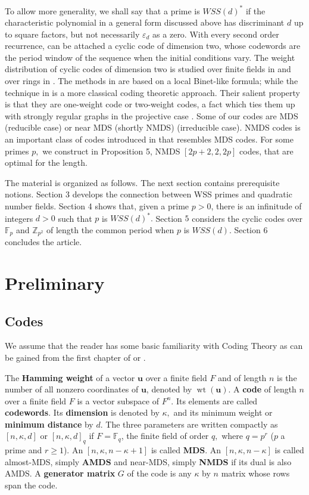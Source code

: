 \documentclass[12pt,reqno]{amsart}
\newcommand{\F}{\mathbb{F}}
\newcommand{\Z}{\mathbb{Z}}
\DeclareMathOperator{\wt}{wt}
\renewcommand{\vec}[1]{\boldsymbol{#1}} %
\begin{document}
To allow more generality, we shall say that a prime is $WSS(d)^*$ if the characteristic polynomial in a general form discussed above has discriminant $d$ up to square factors, but not necessarily $\varepsilon_d$ as a zero.
With every second order recurrence, can be attached a cyclic code of dimension two, whose codewords are the period window of the sequence when the initial conditions vary.
The weight distribution of cyclic codes of dimension two is studied over finite fields in \cite{SZS,V1,V2} and over rings in \cite{SHS,SLS}. The methods in \cite{SHS,SLS,SZS}
are based on a local Binet-like formula; while the technique in \cite{V1,V2} is a more classical coding theoretic approach.
Their salient property is that they are one-weight code or
two-weight codes, a fact which ties them up with strongly regular graphs in the projective case \cite{BM}. Some of our codes are MDS (reducible case) or  near MDS (shortly NMDS) (irreducible case). NMDS codes is an important class of codes introduced in \cite{DL} that resembles MDS codes.
For some primes $p,$ we construct in Proposition 5,  NMDS $[2p+2,2,2p]$ codes, that are optimal for the length.

The material is organized as follows. The next section contains prerequisite notions. Section 3 develops the connection between WSS primes and quadratic number fields. Section 4 shows that, given a prime $p>0$, there is an infinitude of integers $d >0$ such that $p$ is $WSS(d)^*.$ Section $5$ considers the cyclic codes over $\F_p$ and $\Z_{p^2}$ of length the common period when $p$ is $WSS(d).$ Section $6$ concludes the article.
\section{Preliminary}
\subsection{Codes}
We assume that the reader has some basic familiarity with Coding Theory as can be gained from the first chapter of \cite{MacSlo} or \cite{HuffmanPless}.

The {\bf Hamming weight} of a vector $\vec{u}$ over a finite field $F$ and of length $n$ is the number of all nonzero coordinates of $\vec{u}$, denoted by $\wt(\vec{u})$.
A {\bf code} of length $n$ over a finite field $F$ is a vector subspace of $F^n.$
Its elements are called {\bf codewords}.
Its {\bf dimension} is denoted by $\kappa,$ and its minimum weight or {\bf minimum distance} by $d.$
The three parameters are written compactly as $[n,\kappa,d]$ or $[n,\kappa,d]_q$ if $F=\mathbb F_q$, the finite field of order $q,$ where $q=p^r$ ($p$ a prime and $r\ge1$).
An $[n,\kappa,n-\kappa+1]$ is called {\bf MDS}.
An $[n,\kappa,n-\kappa]$ is called almost-MDS, simply {\bf AMDS}
and near-MDS, simply {\bf NMDS} if its dual is also AMDS.
A {\bf generator matrix} $G$ of the code is any $\kappa$ by $n$ matrix whose rows span the code.
\end{document}
